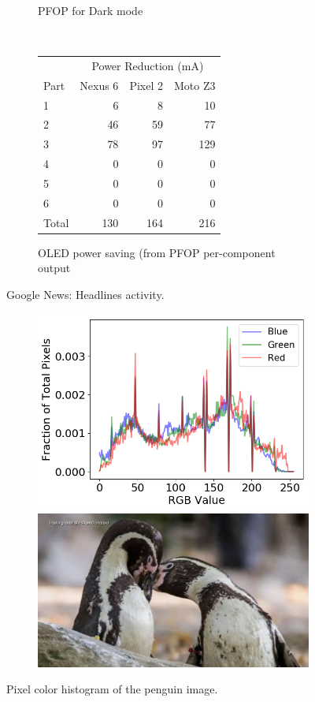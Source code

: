 \begin{figure}[th]
\begin{subfigure}[]{\columnwidth}
		\caption{PFOP for Dark mode}
	\end{subfigure}
	\\
	\begin{subfigure}[]{\columnwidth}
	\centering
	{ \small
	\begin{tabular}{ | l | r | r | r | }
		\hline
		     & \multicolumn{3}{|c|}{Power Reduction (mA)}\\
		\cline{2-4}
                Part & Nexus 6 & Pixel 2 & Moto Z3 \\
		\hline
		1 &   6  &   8 &   10  \\
		2 &  46  &  59 &   77  \\
		3 &  78  &  97 &  129  \\
		4 &   0  &   0 &    0  \\
		5 &   0  &   0 &    0  \\
		6 &   0  &   0 &    0  \\
		\hline
		Total   & 130 & 164 & 216  \\
		\hline
	\end{tabular}
	}
	\caption{OLED power saving (from PFOP per-component output}		
        \vspace{-0.1in}
	\end{subfigure}
	\caption{Google News: Headlines activity.}
        \vspace{-0.20in}
	\label{fig:case_study_news}
\end{figure}

\begin{figure}[h]
	\begin{subfigure}[]{\columnwidth}
		\includegraphics[width=0.58\columnwidth]{./figure/692a_news_penguin.png}\quad
		\includegraphics[width=0.27\columnwidth]{./figure/691_news_penguin.png}
	\end{subfigure}
	\caption{Pixel color histogram of the penguin image.}
        \vspace{-0.1in}
	\label{fig:case_study_embedde_object}
\end{figure}
\fi

